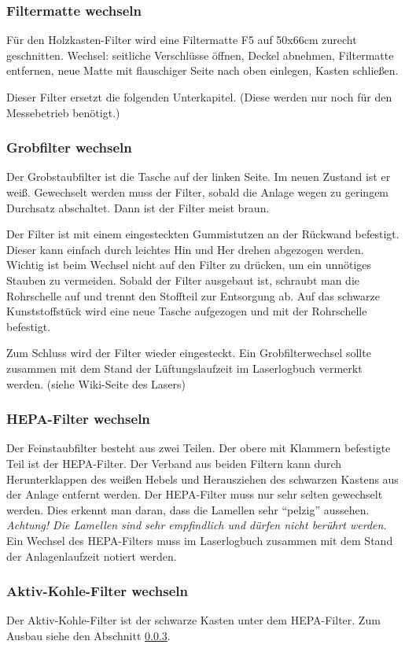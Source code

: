 \documentclass{\basedir/fablab-document}
\begin{document}
	\subsubsection{Filtermatte wechseln}
	Für den Holzkasten-Filter wird eine Filtermatte F5 auf 50x66cm zurecht geschnitten.
	Wechsel: seitliche Verschlüsse öffnen, Deckel abnehmen, Filtermatte entfernen, neue Matte mit flauschiger Seite nach oben einlegen, Kasten schließen.
	
	Dieser Filter ersetzt die folgenden Unterkapitel. (Diese werden nur noch für den Messebetrieb benötigt.)
	\subsubsection{Grobfilter wechseln}
	Der Grobstaubfilter ist die Tasche auf der linken Seite. Im neuen Zustand ist er weiß. Gewechselt werden muss der Filter, sobald die Anlage wegen zu geringem Durchsatz abschaltet. Dann ist der Filter meist braun.
	
	Der Filter ist mit einem eingesteckten Gummistutzen an der Rückwand befestigt. Dieser kann einfach durch leichtes Hin und Her drehen abgezogen werden. Wichtig ist beim Wechsel nicht auf den Filter zu drücken, um ein unnötiges Stauben zu vermeiden. Sobald der Filter ausgebaut ist, schraubt man die Rohrschelle auf und trennt den Stoffteil zur Entsorgung ab. Auf das schwarze Kunststoffstück wird eine neue Tasche aufgezogen und mit der Rohrschelle befestigt.
	
	Zum Schluss wird der Filter wieder eingesteckt. Ein Grobfilterwechsel sollte zusammen mit dem Stand der Lüftungslaufzeit im Laserlogbuch vermerkt werden. (siehe Wiki-Seite des Lasers)
	\subsubsection{HEPA-Filter wechseln}
	\label{subsubsec:HEPA-Filter}
	Der Feinstaubfilter besteht aus zwei Teilen. Der obere mit Klammern befestigte Teil ist der HEPA-Filter. Der Verband aus beiden Filtern kann durch Herunterklappen des weißen Hebels und Herausziehen des schwarzen Kastens aus der Anlage entfernt werden.
	Der HEPA-Filter muss nur sehr selten gewechselt werden. Dies erkennt man daran, dass die Lamellen sehr \enquote{pelzig} aussehen. \emph{Achtung! Die Lamellen sind sehr empfindlich und dürfen nicht berührt werden.}
	Ein Wechsel des HEPA-Filters muss im Laserlogbuch zusammen mit dem Stand der Anlagenlaufzeit notiert werden.
	\subsubsection{Aktiv-Kohle-Filter wechseln}
	Der Aktiv-Kohle-Filter ist der schwarze Kasten unter dem HEPA-Filter. Zum Ausbau siehe den Abschnitt \ref{subsubsec:HEPA-Filter}.
	
\end{document}
